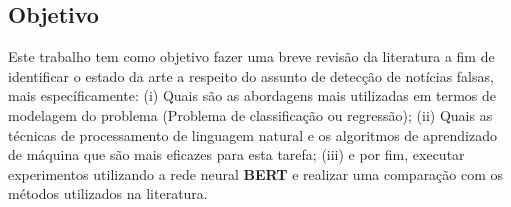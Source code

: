 \subsection{Objetivo}


Este trabalho tem como objetivo fazer uma breve revisão da literatura a fim de identificar o estado da arte a respeito do assunto de detecção de notícias falsas, mais específicamente: (i) Quais são as abordagens mais utilizadas em termos de modelagem do problema (Problema de classificação ou regressão); (ii) Quais as técnicas de processamento de linguagem natural e os algoritmos de aprendizado de máquina que são mais eficazes para esta tarefa; (iii) e por fim, executar experimentos utilizando a rede neural \textbf{BERT} e realizar uma comparação com os métodos utilizados na literatura.



